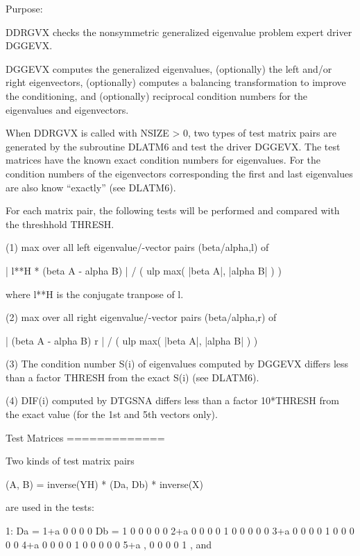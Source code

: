 \begin{DoxyParagraph}{Purpose\+: }
\begin{DoxyVerb} DDRGVX checks the nonsymmetric generalized eigenvalue problem
 expert driver DGGEVX.

 DGGEVX computes the generalized eigenvalues, (optionally) the left
 and/or right eigenvectors, (optionally) computes a balancing
 transformation to improve the conditioning, and (optionally)
 reciprocal condition numbers for the eigenvalues and eigenvectors.

 When DDRGVX is called with NSIZE > 0, two types of test matrix pairs
 are generated by the subroutine DLATM6 and test the driver DGGEVX.
 The test matrices have the known exact condition numbers for
 eigenvalues. For the condition numbers of the eigenvectors
 corresponding the first and last eigenvalues are also know
 ``exactly'' (see DLATM6).

 For each matrix pair, the following tests will be performed and
 compared with the threshhold THRESH.

 (1) max over all left eigenvalue/-vector pairs (beta/alpha,l) of

    | l**H * (beta A - alpha B) | / ( ulp max( |beta A|, |alpha B| ) )

     where l**H is the conjugate tranpose of l.

 (2) max over all right eigenvalue/-vector pairs (beta/alpha,r) of

       | (beta A - alpha B) r | / ( ulp max( |beta A|, |alpha B| ) )

 (3) The condition number S(i) of eigenvalues computed by DGGEVX
     differs less than a factor THRESH from the exact S(i) (see
     DLATM6).

 (4) DIF(i) computed by DTGSNA differs less than a factor 10*THRESH
     from the exact value (for the 1st and 5th vectors only).

 Test Matrices
 =============

 Two kinds of test matrix pairs

          (A, B) = inverse(YH) * (Da, Db) * inverse(X)

 are used in the tests:

 1: Da = 1+a   0    0    0    0    Db = 1   0   0   0   0
          0   2+a   0    0    0         0   1   0   0   0
          0    0   3+a   0    0         0   0   1   0   0
          0    0    0   4+a   0         0   0   0   1   0
          0    0    0    0   5+a ,      0   0   0   0   1 , and


\end{DoxyVerb}
\end{DoxyParagraph}
